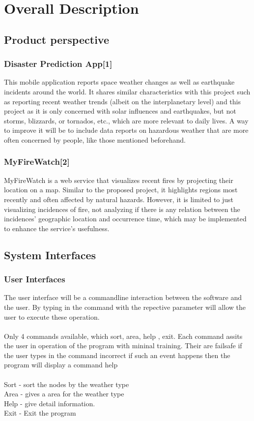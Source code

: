 \documentclass{article}
\begin{document}
\section{Overall Description}
\subsection{Product perspective}
\subsubsection*{Disaster Prediction App[1]}
This mobile application reports space weather changes as well as earthquake
incidents around the world. It shares similar characteristics with this project
such as reporting recent weather trends (albeit on the interplanetary level) and
this project as it is only concerned with solar influences and earthquakes, but
not storms, blizzards, or tornados, etc., which are more relevant to daily lives.
A way to improve it will be to include data reports on hazardous weather that are
more often concerned by people, like those mentioned beforehand.

\subsubsection*{MyFireWatch[2]}
MyFireWatch is a web service that visualizes recent fires by projecting their
location on a map. Similar to the proposed project, it highlights regions most
recently and often affected by natural hazards. However, it is limited to just
visualizing incidences of fire, not analyzing if there is any relation between
the incidences’ geographic location and occurrence time, which may be implemented
to enhance the service’s usefulness.


\subsection{System Interfaces}
\subsubsection{User Interfaces}
The user interface will be a commandline interaction between the software and the user.
By typing in the command with the repective parameter will allow the user to execute these operation.
\\\\
Only 4 commands available, which sort, area, help , exit. Each command assits the user in operation of the program with
mininal training. Their are failsafe if the user types in the command incorrect if such an event happens then the program will display a command help\
\\\\
Sort - sort the nodes by the weather type\\
Area - gives a area for the weather type\\
Help - give detail information.\\
Exit - Exit the program \\
\end{document}
